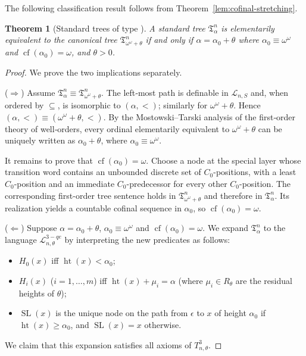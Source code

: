 \documentclass{amsart}
\newcommand{\cf}{\operatorname{cf}}
\newtheorem{theorem}{Theorem}
\theoremstyle{definition}
\begin{document}
The following classification result follows from Theorem~\ref{lem:cofinal-stretching}.
\begin{theorem}[Standard trees of type \MakeUppercase{}]\label{thm:3-classify}
    A standard tree $\mathfrak{T}_\alpha^n$ is elementarily equivalent to the canonical tree $\mathfrak{T}_{\omega^\omega+\theta}^n$ if and only if $\alpha=\alpha_0+\theta$ where $\alpha_0\equiv\omega^\omega$ and $\cf(\alpha_0)=\omega$, and $\theta>0$.
\end{theorem}
\begin{proof}
    We prove the two implications separately.

    ($\Rightarrow$) Assume $\mathfrak{T}_\alpha^n\equiv\mathfrak{T}_{\omega^\omega+\theta}^n$.  The left‑most path is definable in $\mathcal{L}_{n,S}$ and, when ordered by $\subseteq$, is isomorphic to $(\alpha,<)$; similarly for $\omega^\omega+\theta$. Hence $(\alpha,<)\equiv(\omega^\omega+\theta,<)$. By the Mostowski–Tarski analysis of the first‑order theory of well‑orders, every ordinal elementarily equivalent to $\omega^\omega+\theta$ can be uniquely written as $\alpha_0+\theta$, where $\alpha_0\equiv\omega^\omega$.

    It remains to prove that $\cf(\alpha_0)=\omega$. Choose a node at the special layer whose transition word contains an unbounded discrete set of $C_0$-positions, with a least $C_0$-position and an immediate $C_0$-predecessor for every other $C_0$-position. The corresponding first-order tree sentence holds in $\mathfrak T_{\omega^\omega+\theta}^n$ and therefore in $\mathfrak T_\alpha^n$. Its realization yields a countable cofinal sequence in $\alpha_0$, so $\cf(\alpha_0)=\omega$.

    ($\Leftarrow$) Suppose $\alpha=\alpha_0+\theta$, $\alpha_0\equiv\omega^\omega$ and $\cf(\alpha_0)=\omega$. We expand $\mathfrak{T}_\alpha^n$ to the language $\mathcal{L}_{n,\theta}^{3-qe}$ by interpreting the new predicates as follows:
    \begin{itemize}
        \item $H_0(x)$ iff $\operatorname{ht}(x)<\alpha_0$;
        \item $H_i(x)$ ($i=1,\dots,m$) iff $\operatorname{ht}(x)+\mu_i=\alpha$ (where $\mu_i\in R_\theta$ are the residual heights of $\theta$);
        \item $\operatorname{SL}(x)$ is the unique node on the path from $\epsilon$ to $x$ of height $\alpha_0$ if $\operatorname{ht}(x)\ge\alpha_0$, and $\operatorname{SL}(x)=x$ otherwise.
    \end{itemize}
    We claim that this expansion satisfies all axioms of $T_{n,\theta}^3$.


\end{proof}
\end{document}

